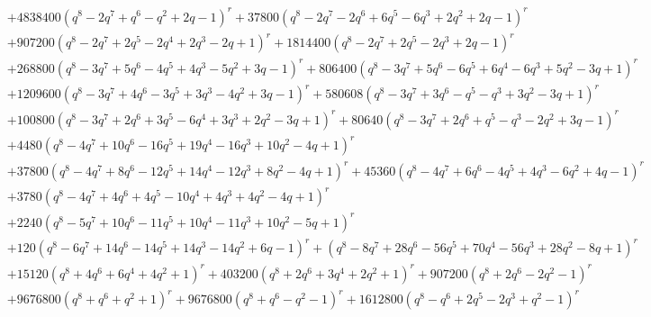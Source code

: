 \documentclass[11pt,english]{amsart}
\numberwithin{equation}{section}
\numberwithin{figure}{section}
\theoremstyle{plain}
\theoremstyle{plain}
\theoremstyle{definition}
\theoremstyle{remark}
\begin{document}
{\begin{align*}
& + 4838400  {\left(q^{8} - 2  q^{7} + q^{6} - q^{2} + 2  q - 1\right)}^{r} + 37800  {\left(q^{8} - 2  q^{7} - 2  q^{6} + 6  q^{5} - 6  q^{3} + 2  q^{2} + 2  q - 1\right)}^{r} \\
& + 907200  {\left(q^{8} - 2  q^{7} + 2  q^{5} - 2  q^{4} + 2  q^{3} - 2  q + 1\right)}^{r} + 1814400  {\left(q^{8} - 2  q^{7} + 2  q^{5} - 2  q^{3} + 2  q - 1\right)}^{r} \\
& + 268800  {\left(q^{8} - 3  q^{7} + 5  q^{6} - 4  q^{5} + 4  q^{3} - 5  q^{2} + 3  q - 1\right)}^{r} + 806400  {\left(q^{8} - 3  q^{7} + 5  q^{6} - 6  q^{5} + 6  q^{4} - 6  q^{3} + 5  q^{2} - 3  q + 1\right)}^{r} \\
& + 1209600  {\left(q^{8} - 3  q^{7} + 4  q^{6} - 3  q^{5} + 3  q^{3} - 4  q^{2} + 3  q - 1\right)}^{r} + 580608  {\left(q^{8} - 3  q^{7} + 3  q^{6} - q^{5} - q^{3} + 3  q^{2} - 3  q + 1\right)}^{r} \\
& + 100800  {\left(q^{8} - 3  q^{7} + 2  q^{6} + 3  q^{5} - 6  q^{4} + 3  q^{3} + 2  q^{2} - 3  q + 1\right)}^{r} + 80640  {\left(q^{8} - 3  q^{7} + 2  q^{6} + q^{5} - q^{3} - 2  q^{2} + 3  q - 1\right)}^{r} \\
& + 4480  {\left(q^{8} - 4  q^{7} + 10  q^{6} - 16  q^{5} + 19  q^{4} - 16  q^{3} + 10  q^{2} - 4  q + 1\right)}^{r} \\
& + 37800  {\left(q^{8} - 4  q^{7} + 8  q^{6} - 12  q^{5} + 14  q^{4} - 12  q^{3} + 8  q^{2} - 4  q + 1\right)}^{r} + 45360  {\left(q^{8} - 4  q^{7} + 6  q^{6} - 4  q^{5} + 4  q^{3} - 6  q^{2} + 4  q - 1\right)}^{r} \\
& + 3780  {\left(q^{8} - 4  q^{7} + 4  q^{6} + 4  q^{5} - 10  q^{4} + 4  q^{3} + 4  q^{2} - 4  q + 1\right)}^{r} \\
& + 2240  {\left(q^{8} - 5  q^{7} + 10  q^{6} - 11  q^{5} + 10  q^{4} - 11  q^{3} + 10  q^{2} - 5  q + 1\right)}^{r} \\
& + 120  {\left(q^{8} - 6  q^{7} + 14  q^{6} - 14  q^{5} + 14  q^{3} - 14  q^{2} + 6  q - 1\right)}^{r} + {\left(q^{8} - 8  q^{7} + 28  q^{6} - 56  q^{5} + 70  q^{4} - 56  q^{3} + 28  q^{2} - 8  q + 1\right)}^{r} \\
& + 15120  {\left(q^{8} + 4  q^{6} + 6  q^{4} + 4  q^{2} + 1\right)}^{r} + 403200  {\left(q^{8} + 2  q^{6} + 3  q^{4} + 2  q^{2} + 1\right)}^{r} + 907200  {\left(q^{8} + 2  q^{6} - 2  q^{2} - 1\right)}^{r} \\
& + 9676800  {\left(q^{8} + q^{6} + q^{2} + 1\right)}^{r} + 9676800  {\left(q^{8} + q^{6} - q^{2} - 1\right)}^{r} + 1612800  {\left(q^{8} - q^{6} + 2  q^{5} - 2  q^{3} + q^{2} - 1\right)}^{r} \\

\end{align*}}
\end{document}

